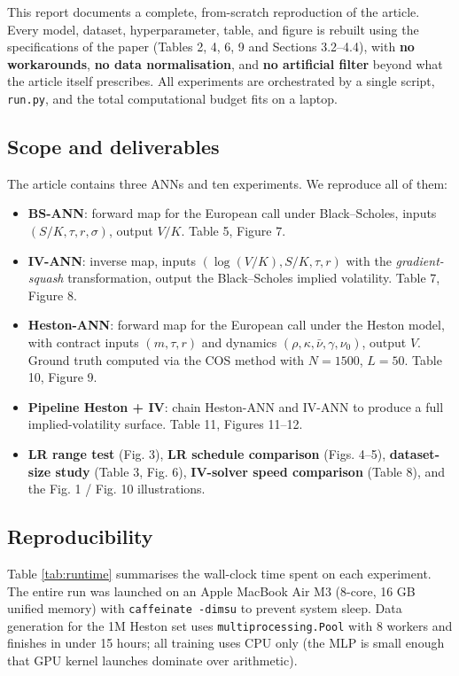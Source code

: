 \documentclass[11pt,a4paper]{article}
\begin{document}
This report documents a complete, from-scratch reproduction of the article.
Every model, dataset, hyperparameter, table, and figure is rebuilt using the
specifications of the paper (Tables 2, 4, 6, 9 and Sections 3.2--4.4), with
\textbf{no workarounds}, \textbf{no data normalisation}, and \textbf{no
artificial filter} beyond what the article itself prescribes. All
experiments are orchestrated by a single script, \texttt{run.py}, and the
total computational budget fits on a laptop.

\subsection{Scope and deliverables}

The article contains three ANNs and ten experiments. We reproduce all of
them:

\begin{itemize}
    \item \textbf{BS-ANN}: forward map for the European call under
    Black--Scholes, inputs $(S/K, \tau, r, \sigma)$, output $V/K$.
    Table 5, Figure 7.
    \item \textbf{IV-ANN}: inverse map, inputs
    $(\log(V/K), S/K, \tau, r)$ with the \emph{gradient-squash}
    transformation, output the Black--Scholes implied volatility.
    Table 7, Figure 8.
    \item \textbf{Heston-ANN}: forward map for the European call under the
    Heston model, with contract inputs $(m, \tau, r)$ and dynamics
    $(\rho, \kappa, \bar\nu, \gamma, \nu_0)$, output $V$. Ground truth
    computed via the COS method with $N=1500$, $L=50$. Table 10, Figure 9.
    \item \textbf{Pipeline Heston + IV}: chain Heston-ANN and IV-ANN to
    produce a full implied-volatility surface. Table 11, Figures 11--12.
    \item \textbf{LR range test} (Fig. 3), \textbf{LR schedule comparison}
    (Figs. 4--5), \textbf{dataset-size study} (Table 3, Fig. 6),
    \textbf{IV-solver speed comparison} (Table 8), and the Fig. 1 / Fig. 10
    illustrations.
\end{itemize}

\subsection{Reproducibility}

Table \ref{tab:runtime} summarises the wall-clock time spent on each
experiment. The entire run was launched on an Apple MacBook Air M3 (8-core,
16 GB unified memory) with \texttt{caffeinate -dimsu} to prevent system sleep.
Data generation for the 1M Heston set uses \texttt{multiprocessing.Pool}
with 8 workers and finishes in under 15 hours; all training uses CPU only
(the MLP is small enough that GPU kernel launches dominate over arithmetic).
\end{document}

